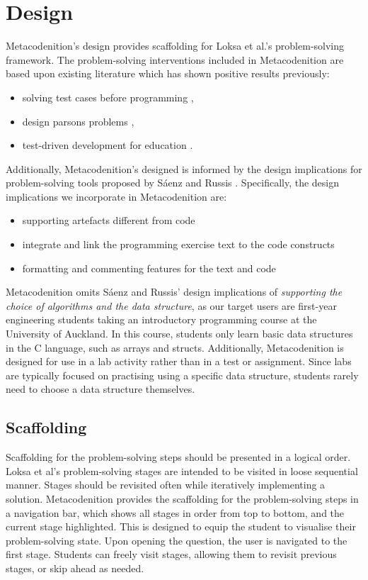 \documentclass[sigconf,authorversion,nonacm]{acmart}
\begin{document}
\section{Design}
Metacodenition's design provides scaffolding for Loksa et al.'s problem-solving framework. The problem-solving interventions included in Metacodenition are based upon existing literature which has shown positive results previously:
\begin{itemize}
\item solving test cases before programming \cite{craig2019, denny2019, prather2019},
\item design parsons problems \cite{garcia2021},
\item test-driven development for education \cite{janzen2008}.
\end{itemize}
Additionally, Metacodenition's designed is informed by the design implications for problem-solving tools proposed by Sáenz and Russis \cite{saenz2022}. Specifically, the design implications we incorporate in Metacodenition are:
\begin{itemize}
\item supporting artefacts different from code
\item integrate and link the programming exercise text to the code constructs
\item formatting and commenting features for the text and code
\end{itemize}
Metacodenition omits Sáenz and Russis' design implications of \emph{supporting the choice of algorithms and the data structure}, as our target users are first-year engineering students taking an introductory programming course at the University of Auckland. In this course, students only learn basic data structures in the C language, such as arrays and structs. Additionally, Metacodenition is designed for use in a lab activity rather than in a test or assignment. Since labs are typically focused on practising using a specific data structure, students rarely need to choose a data structure themselves.

\subsection{Scaffolding}
Scaffolding for the problem-solving steps should be presented in a logical order. Loksa et al's problem-solving stages are intended to be visited in loose sequential manner. Stages should be revisited often while iteratively implementing a solution. Metacodenition provides the scaffolding for the problem-solving steps in a navigation bar, which shows all stages in order from top to bottom, and the current stage highlighted. This is designed to equip the student to visualise their problem-solving state. Upon opening the question, the user is navigated to the first stage. Students can freely visit stages, allowing them to revisit previous stages, or skip ahead as needed. 
\end{document}
